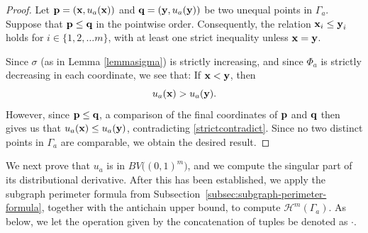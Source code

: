 \documentclass[10pt,a4paper]{amsart}
\begin{document}
\begin{proof}
 Let $\text{{\bf p}} = (\text{{\bf x}}, u_{a}(\text{{\bf x}}))$ and $\text{{\bf q}} = (\text{{\bf y}}, u_a(\text{{\bf y}}))$ be two unequal points in 
 $\Gamma_a$. Suppose that $\text{{\bf p}} \leq \text{{\bf q}}$
 in the pointwise order. Consequently, the relation $\text{{\bf x}}_i \leq \text{{\bf y}}_i$ holds
 for $i \in \{ 1, 2, \ldots m \}$, with at least one strict inequality unless $\text{{\bf x}} = \text{{\bf y}}$. 

 Since $\sigma$ (as in Lemma \ref{lemmasigma}) is strictly increasing, and since $\Phi_a$
 is strictly decreasing in each coordinate, we see that: If $\text{{\bf x}} < \text{{\bf y}}$, then 
\begin{equation}\label{strictcontradict}
 u_{a}(\text{{\bf x}}) > u_a(\text{{\bf y}}). 
\end{equation}
 However, since $\text{{\bf p}} \leq \text{{\bf q}}$,
 a comparison of the final coordinates of $\text{{\bf p}}$ and $\text{{\bf q}}$ then gives us that 
 $u_{a}(\text{{\bf x}}) \leq u_a(\text{{\bf y}})$, contradicting \eqref{strictcontradict}. 
 Since no two distinct points in $\Gamma_a$ are comparable, we obtain the desired result. 
\end{proof}

 We next prove that $u_a$ is in $BV\big( (0,1)^m \big)$, and we compute 
 the singular part of its distributional derivative. After this has been established, we apply the subgraph perimeter 
 formula from Subsection~\ref{subsec:subgraph-perimeter-formula}, together with the antichain upper bound, to compute \(\mathcal H^m(\Gamma_a)\).
 As below, we let the operation given by the concatenation of tuples be denoted as $\cdot$. 
\end{document}
